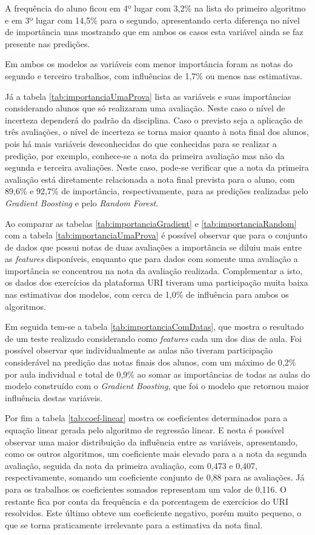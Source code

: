 A frequência do aluno ficou em 4º lugar com 3,2\% na lista do primeiro algoritmo e em 3º lugar com 14,5\% para o segundo, apresentando certa diferença no nível de importância mas mostrando que em ambos os casos esta variável ainda se faz presente nas predições.

Em ambos os modelos as variáveis com menor importância foram as notas do segundo e terceiro trabalhos, com influências de 1,7\% ou menos nas estimativas.

Já a tabela \ref{tab:importanciaUmaProva} lista as variáveis e suas importâncias considerando alunos que só realizaram uma avaliação. Neste caso o nível de incerteza dependerá do padrão da disciplina. Caso o previsto seja a aplicação de três avaliações, o nível de incerteza se torna maior quanto à nota final dos alunos, pois há mais variáveis desconhecidas do que conhecidas para se realizar a predição, por exemplo, conhece-se a nota da primeira avaliação mas não da segunda e terceira avaliações.
Neste caso, pode-se verificar que a nota da primeira avaliação está diretamente relacionada a nota final prevista para o aluno, com 89,6\% e 92,7\% de importância, respectivamente, para as predições realizadas pelo \textit{Gradient Boosting} e pelo \textit{Random Forest}.

Ao comparar as tabelas \ref{tab:importanciaGradient} e \ref{tab:importanciaRandom} com a tabela \ref{tab:importanciaUmaProva} é possível observar que para o conjunto de dados que possui notas de duas avaliações a importância se diluiu mais entre as \textit{features} disponíveis, enquanto que para dados com somente uma avaliação a importância se concentrou na nota da avaliação realizada. 
Complementar a isto, os dados dos exercícios da plataforma URI tiveram uma participação muita baixa nas estimativas dos modelos, com cerca de 1,0\% de influência para ambos os algoritmos.

Em seguida tem-se a tabela \ref{tab:importanciaComDatas}, que mostra o resultado de um teste realizado considerando como \textit{features} cada um dos dias de aula.
Foi possível observar que individualmente as aulas não tiveram participação considerável na predição das notas finais dos alunos, com um máximo de 0,2\% por aula individual e total de 0,9\% ao somar as importâncias de todas as aulas do modelo construído com o \textit{Gradient Boosting}, que foi o modelo que retornou maior influência destas variáveis.

Por fim a tabela \ref{tab:coef-linear} mostra os coeficientes determinados para a equação linear gerada pelo algoritmo de regressão linear. 
E nesta é possível observar uma maior distribuição da influência entre as variáveis, apresentando, como os outros algoritmos, um coeficiente mais elevado para a a nota da segunda avaliação, seguida da nota da primeira avaliação, com 0,473 e 0,407, respectivamente, somando um coeficiente conjunto de 0,88 para as avaliações. 
Já para os trabalhos os coeficientes somados representam um valor de 0,116. 
O restante fica por conta da frequência e da porcentagem de exercícios do URI resolvidos. 
Este último obteve um coeficiente negativo, porém muito pequeno, o que se torna praticamente irrelevante para a estimativa da nota final.

